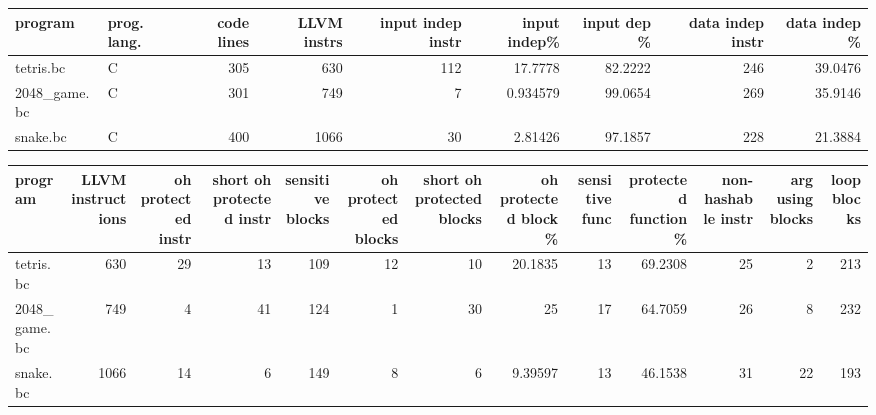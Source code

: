 \documentclass{article}
\begin{document}
\begin{table}[ht]
\centering
\begin{adjustbox}{width=1.3\textwidth}
\begin{tabular}{llrrrrrrr}
\hline
 program      & prog. lang.   &   code lines &   LLVM instrs &   input indep instr &   input indep\% &   input dep \% &   data indep instr &   data indep \% \\
\hline
 tetris.bc    & C             &          305 &           630 &                 112 &      17.7778   &       82.2222 &                246 &        39.0476 \\
 2048\_game.bc & C             &          301 &           749 &                   7 &       0.934579 &       99.0654 &                269 &        35.9146 \\
 snake.bc     & C             &          400 &          1066 &                  30 &       2.81426  &       97.1857 &                228 &        21.3884 \\
\hline
\end{tabular}
\end{adjustbox}
\end{table}

\begin{table}[ht]
\centering
\begin{adjustbox}{width=1.3\textwidth}
\begin{tabular}{lrrrrrrrrrrrr}
\hline
 program      &   LLVM instructions &   oh protected instr &   short oh protected instr &   sensitive blocks &   oh protected blocks &   short oh protected blocks &   oh protected block \% &   sensitive func &   protected function \% &   non-hashable instr &   arg using blocks &   loop blocks \\
\hline
 tetris.bc    &                 630 &                   29 &                         13 &                109 &                    12 &                          10 &               20.1835  &               13 &                69.2308 &                   25 &                  2 &           213 \\
 2048\_game.bc &                 749 &                    4 &                         41 &                124 &                     1 &                          30 &               25       &               17 &                64.7059 &                   26 &                  8 &           232 \\
 snake.bc     &                1066 &                   14 &                          6 &                149 &                     8 &                           6 &                9.39597 &               13 &                46.1538 &                   31 &                 22 &           193 \\
\hline
\end{tabular}
\end{adjustbox}
\end{table}
\end{document}
